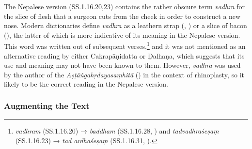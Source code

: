 The Nepalese version (SS.1.16.20,23) contains the rather obscure term \emph{vadhra} for the slice of flesh that a surgeon cuts from the cheek in order to construct a new nose. Modern dictionaries define \emph{vadhra} as a leathern strap (\cite[1385]{apte-prac}, \cite[917]{Monier-Williams}) or a slice of bacon (\cite[917]{Monier-Williams}), the latter of which is more indicative of its meaning in the Nepalese version. This word was written out of subsequent verses,\footnote{\emph{vadhram} (SS.1.16.20) → \emph{baddham} (SS.1.16.28, \cite[81]{vulgate}) and \emph{tadvadhraśeṣaṃ} (SS.1.16.23) → \emph{tad ardhaśeṣaṃ} (SS.1.16.31, \cite[81]{vulgate}).} and it was not mentioned as an alternative reading by either Cakrapāṇidatta or Ḍalhaṇa, which suggests that its use and meaning may not have been known to them. However, \emph{vadhra} was used by the author of the \emph{Aṣṭāṅgahṛdayasaṃhitā} () in the context of rhinoplasty, so it likely to be the correct reading in the Nepalese version. 


%

\subsubsection{Augmenting the Text}

